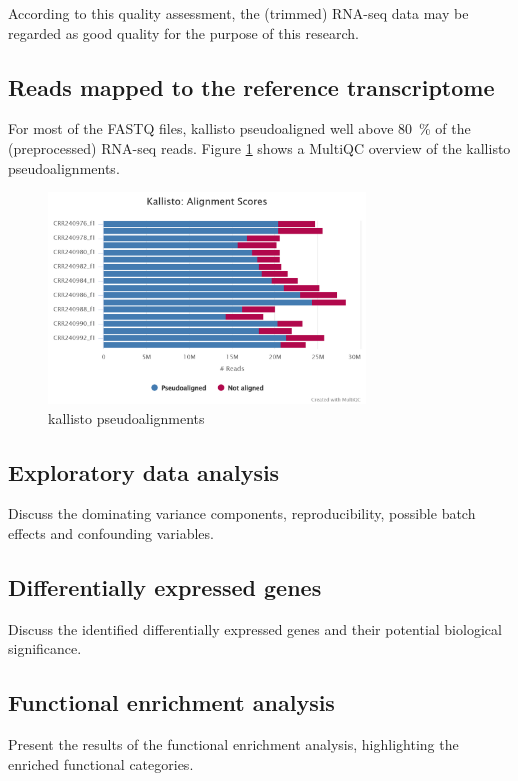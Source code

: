 According to this quality assessment, the (trimmed) RNA-seq data may be regarded as good quality for the purpose of this research.


\subsection{Reads mapped to the reference transcriptome}

For most of the FASTQ files, kallisto pseudoaligned well above \qty{80}{\percent} of the (preprocessed) RNA-seq reads. Figure \ref{fig:0.3-MultiQC_kallisto_alignment} shows a MultiQC overview of the kallisto pseudoalignments.

\begin{figure}[htbp]
    \caption{kallisto pseudoalignments}
    \label{fig:0.3-MultiQC_kallisto_alignment}
    \includegraphics[width=0.75\textwidth]{../../results/multiqc/Plot-Exports/kallisto_alignment}
\end{figure}


\subsection{Exploratory data analysis}
Discuss the dominating variance components, reproducibility, possible batch effects and confounding variables.

\subsection{Differentially expressed genes}
Discuss the identified differentially expressed genes and their potential biological significance.

\subsection{Functional enrichment analysis}
Present the results of the functional enrichment analysis, highlighting the enriched functional categories.